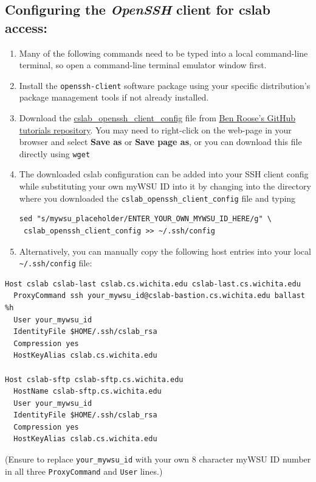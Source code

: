 \documentclass[12pt]{article}
\begin{document}
\begin{flushleft}
\subsection*{Configuring the \textit{OpenSSH} client for cslab access:}
\begin{enumerate}
  \item Many of the following commands need to be typed into a local command-line terminal, so open a command-line terminal emulator window first.
  \item Install the \texttt{openssh-client} software package using your specific distribution's package management tools if not already installed.
  \item Download the \href{https://raw.githubusercontent.com/benroose/tutorials/master/cslab_tutorials/cslab_ssh_client_config_files/cslab_openssh_client_config}{cslab\_openssh\_client\_config} file from \href{https://github.com/benroose/tutorials/tree/master/cslab_tutorials/}{Ben Roose's GitHub tutorials repository}. You may need to right-click on the web-page in your browser and select \textbf{Save as} or \textbf{Save page as}, or you can download this file directly using \verb|wget|
  \item The downloaded cslab configuration can be added into your SSH client config while substituting your own myWSU ID into it by changing into the directory where you downloaded the \verb|cslab_openssh_client_config| file and typing
\begin{verbatim}
sed "s/mywsu_placeholder/ENTER_YOUR_OWN_MYWSU_ID_HERE/g" \
 cslab_openssh_client_config >> ~/.ssh/config
\end{verbatim}
  \item Alternatively, you can manually copy the following host entries into your local \verb|~/.ssh/config| file:
\end{enumerate}

\begin{verbatim}
Host cslab cslab-last cslab.cs.wichita.edu cslab-last.cs.wichita.edu
  ProxyCommand ssh your_mywsu_id@cslab-bastion.cs.wichita.edu ballast %h
  User your_mywsu_id
  IdentityFile $HOME/.ssh/cslab_rsa
  Compression yes
  HostKeyAlias cslab.cs.wichita.edu

Host cslab-sftp cslab-sftp.cs.wichita.edu
  HostName cslab-sftp.cs.wichita.edu
  User your_mywsu_id
  IdentityFile $HOME/.ssh/cslab_rsa
  Compression yes
  HostKeyAlias cslab.cs.wichita.edu
\end{verbatim}
(Ensure to replace \verb|your_mywsu_id| with your own 8 character myWSU ID number in all three \texttt{ProxyCommand} and \texttt{User} lines.)


\end{flushleft}
\end{document}
